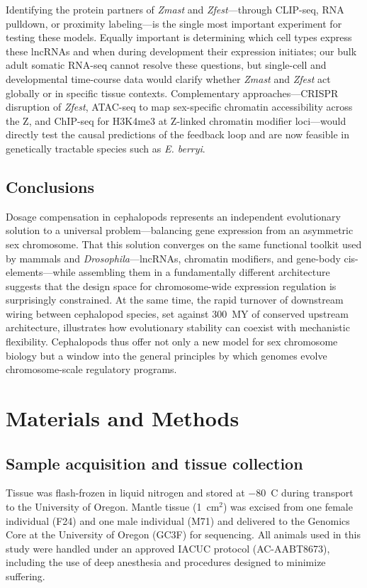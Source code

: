 \documentclass[12pt]{article}
\begin{document}
Identifying the protein partners of \textit{Zmast} and \textit{Zfest}---through
CLIP-seq, RNA pulldown, or proximity labeling---is
the single most important experiment for testing these models.
Equally important is determining which cell types express these lncRNAs
and when during development their expression initiates;
our bulk adult somatic RNA-seq cannot resolve these questions,
but single-cell and developmental time-course data
would clarify whether \textit{Zmast} and \textit{Zfest}
act globally or in specific tissue contexts.
Complementary approaches---CRISPR disruption of \textit{Zfest},
ATAC-seq to map sex-specific chromatin accessibility across the Z,
and ChIP-seq for H3K4me3 at Z-linked chromatin modifier loci---would
directly test the causal predictions of the feedback loop
and are now feasible in genetically tractable species such as \textit{E. berryi}.

\subsection*{Conclusions}

Dosage compensation in cephalopods represents an independent evolutionary solution
to a universal problem---balancing gene expression from an asymmetric sex chromosome.
That this solution converges on the same functional toolkit
used by mammals and \textit{Drosophila}---lncRNAs, chromatin modifiers,
and gene-body cis-elements---while assembling them
in a fundamentally different architecture
suggests that the design space for chromosome-wide expression regulation
is surprisingly constrained.
At the same time, the rapid turnover of downstream wiring
between cephalopod species, set against 300~MY of conserved upstream architecture,
illustrates how evolutionary stability can coexist with mechanistic flexibility.
Cephalopods thus offer not only a new model for sex chromosome biology
but a window into the general principles
by which genomes evolve chromosome-scale regulatory programs.

\section*{Materials and Methods}

\subsection*{Sample acquisition and tissue collection}

Tissue was flash-frozen in liquid nitrogen and stored at $-80$~\textdegree C
during transport to the University of Oregon.
Mantle tissue (1~cm$^2$) was excised from one female individual (F24)
and one male individual (M71)
and delivered to the Genomics Core at the University of Oregon (GC3F) for sequencing.
All animals used in this study were handled under an approved IACUC protocol (AC-AABT8673),
including the use of deep anesthesia and procedures designed to minimize suffering.
\end{document}

